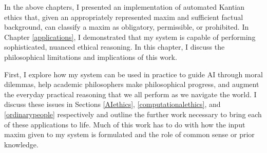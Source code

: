 %
\begin{isabellebody}%
%
%
\isadelimtheory
%
\endisadelimtheory
%
\isatagtheory
%
\endisatagtheory
{\isafoldtheory}%
%
\isadelimtheory
%
\endisadelimtheory
%
\isadelimdocument
%
\endisadelimdocument
%
\isatagdocument
%
\isamarkuptrue%
%
\endisatagdocument
{\isafolddocument}%
%
\isadelimdocument
%
\endisadelimdocument
%
\begin{isamarkuptext}%
In the above chapters, I presented an implementation of automated Kantian ethics that, given an appropriately
represented maxim and sufficient factual background, can classify a maxim as obligatory, permissible, 
or prohibited. In Chapter \ref{applications}, I demonstrated that my system is capable of performing sophisticated,
nuanced ethical reasoning. In this chapter, I discuss the philosophical limitations and implications of this 
work.

First, I explore how my system can be used in practice to guide AI through moral dilemmas,
help academic philosophers make philosophical progress, and augment the everyday practical reasoning 
that we all perform as we navigate the world. I discuss these issues in Sections \ref{AIethics}, 
\ref{computationalethics}, and \ref{ordinarypeople} respectively and outline the further work
necessary to bring each of these applications to life. Much of this work has to do with how the input
maxim given to my system is formulated and the role of common sense or prior knowledge. 


\end{isamarkuptext}
\end{isabellebody}
